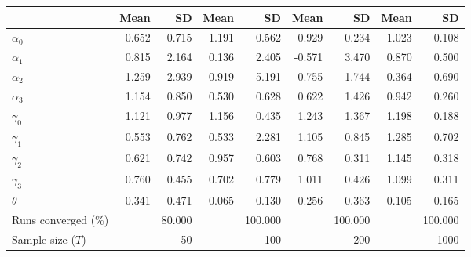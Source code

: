
\begin{tabular}[t]{lrrrrrrrr}
\toprule
  & Mean & SD & Mean  & SD  & Mean   & SD   & Mean    & SD   \\
\midrule
$\alpha_{0}$ & 0.652 & 0.715 & 1.191 & 0.562 & 0.929 & 0.234 & 1.023 & 0.108\\
$\alpha_{1}$ & 0.815 & 2.164 & 0.136 & 2.405 & -0.571 & 3.470 & 0.870 & 0.500\\
$\alpha_{2}$ & -1.259 & 2.939 & 0.919 & 5.191 & 0.755 & 1.744 & 0.364 & 0.690\\
$\alpha_{3}$ & 1.154 & 0.850 & 0.530 & 0.628 & 0.622 & 1.426 & 0.942 & 0.260\\
$\gamma_{0}$ & 1.121 & 0.977 & 1.156 & 0.435 & 1.243 & 1.367 & 1.198 & 0.188\\
$\gamma_{1}$ & 0.553 & 0.762 & 0.533 & 2.281 & 1.105 & 0.845 & 1.285 & 0.702\\
$\gamma_{2}$ & 0.621 & 0.742 & 0.957 & 0.603 & 0.768 & 0.311 & 1.145 & 0.318\\
$\gamma_{3}$ & 0.760 & 0.455 & 0.702 & 0.779 & 1.011 & 0.426 & 1.099 & 0.311\\
$\theta$ & 0.341 & 0.471 & 0.065 & 0.130 & 0.256 & 0.363 & 0.105 & 0.165\\
Runs converged (\%) &  & 80.000 &  & 100.000 &  & 100.000 &  & 100.000\\
Sample size ($T$) &  & 50 &  & 100 &  & 200 &  & 1000\\
\bottomrule
\end{tabular}
